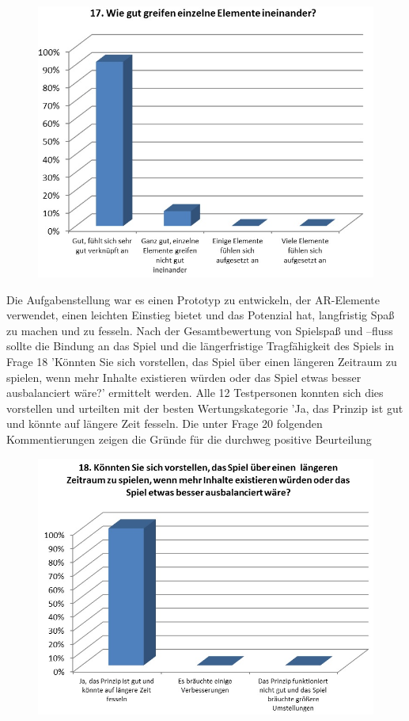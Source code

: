 \documentclass[extern,palatino]{cgBA}
\begin{document}
\begin{figure}[H]
	\centering
	\includegraphics[width=1\textwidth]{table14.jpg}
\end{figure}
Die Aufgabenstellung war es einen Prototyp zu entwickeln, der AR-Elemente verwendet, einen leichten Einstieg bietet und das Potenzial hat, langfristig Spaß zu machen und zu fesseln. Nach der Gesamtbewertung von Spielspaß und –fluss sollte die Bindung an das Spiel und die längerfristige Tragfähigkeit des Spiels in Frage 18 'Könnten Sie sich vorstellen, das Spiel über einen  längeren Zeitraum zu spielen, wenn mehr Inhalte existieren würden oder das Spiel etwas besser ausbalanciert wäre?' ermittelt werden. Alle 12 Testpersonen konnten sich dies vorstellen und urteilten mit der besten Wertungskategorie 'Ja, das Prinzip ist gut und könnte auf längere Zeit fesseln. Die unter Frage 20 folgenden Kommentierungen zeigen die Gründe für die durchweg positive Beurteilung  
\begin{figure}[H]
	\centering
	\includegraphics[width=1\textwidth]{table15.jpg}
\end{figure} 
\end{document}
